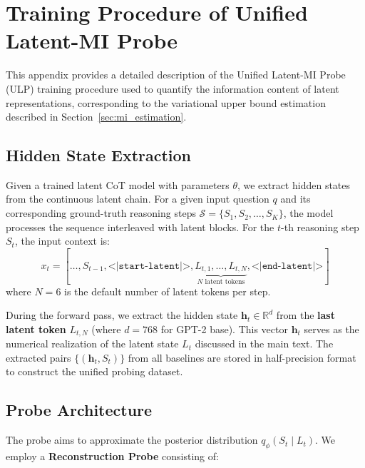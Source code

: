 \newpage
\section{Training Procedure of Unified Latent-MI Probe}
\label{app:d}

This appendix provides a detailed description of the Unified Latent-MI Probe (ULP) training procedure used to quantify the information content of latent representations, corresponding to the variational upper bound estimation described in Section~\ref{sec:mi_estimation}.

\subsection{Hidden State Extraction}

Given a trained latent CoT model with parameters $\theta$, we extract hidden states from the continuous latent chain. For a given input question $q$ and its corresponding ground-truth reasoning steps $\mathcal{S} = \{S_1, S_2, \ldots, S_K\}$, the model processes the sequence interleaved with latent blocks. For the $t$-th reasoning step $S_t$, the input context is:
\begin{equation}
    x_t = [\ldots, S_{t-1}, \texttt{<|start-latent|>}, \underbrace{L_{t,1}, \ldots, L_{t,N}}_{N \text{ latent tokens}}, \texttt{<|end-latent|>}]
\end{equation}
where $N=6$ is the default number of latent tokens per step. 

During the forward pass, we extract the hidden state $\mathbf{h}_t \in \mathbb{R}^{d}$ from the \textbf{last latent token} $L_{t,N}$ (where $d=768$ for GPT-2 base). This vector $\mathbf{h}_t$ serves as the numerical realization of the latent state $L_t$ discussed in the main text. The extracted pairs $\{(\mathbf{h}_t, S_t)\}$ from all baselines are stored in half-precision format to construct the unified probing dataset.

\subsection{Probe Architecture}

The probe aims to approximate the posterior distribution $q_{\phi}(S_t \mid L_t)$. We employ a \textbf{Reconstruction Probe} consisting of:

